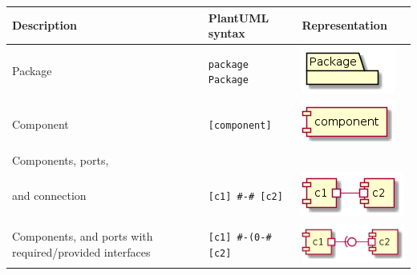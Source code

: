 \begin{longtable}{>{\centering}m{1.8in} >{\centering}m{2in} >{\centering\arraybackslash}m{1.5in}}
\toprule
\textbf{Description} & \textbf{PlantUML syntax} & \textbf{Representation} \\
\midrule
Package & \texttt{package Package} & \includegraphics[width=0.5\linewidth]{figure/plantuml_example/package.png} \\ \hline
Component & \texttt{[component]} & \includegraphics[width=0.5\linewidth]{figure/plantuml_example/component.png} \\ \hline
Components, ports, \\and connection &  \texttt{[c1] \#-\# [c2]} & \includegraphics[width=0.6\linewidth]{figure/plantuml_example/port.png}\\ \hline
Components, and ports with required/provided interfaces & \texttt{[c1] \#-(0-\# [c2]} & \includegraphics[width=0.8\linewidth]{figure/plantuml_example/port_type.png}\\ \hline

\end{longtable}
